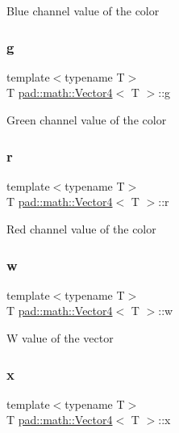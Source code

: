 Blue channel value of the color \mbox{\label{structpad_1_1math_1_1_vector4_ac4a05c791e0522930bed20045239e870}} 
\subsubsection{\texorpdfstring{g}{g}}
{\footnotesize\ttfamily template$<$typename T$>$ \\
T \mbox{\hyperlink{structpad_1_1math_1_1_vector4}{pad\+::math\+::\+Vector4}}$<$ T $>$\+::g}

Green channel value of the color \mbox{\label{structpad_1_1math_1_1_vector4_a2288e82eaf6dd6c283f4714503b13096}} 
\subsubsection{\texorpdfstring{r}{r}}
{\footnotesize\ttfamily template$<$typename T$>$ \\
T \mbox{\hyperlink{structpad_1_1math_1_1_vector4}{pad\+::math\+::\+Vector4}}$<$ T $>$\+::r}

Red channel value of the color \mbox{\label{structpad_1_1math_1_1_vector4_abbbd617d5083a886936724282216bee4}} 
\subsubsection{\texorpdfstring{w}{w}}
{\footnotesize\ttfamily template$<$typename T$>$ \\
T \mbox{\hyperlink{structpad_1_1math_1_1_vector4}{pad\+::math\+::\+Vector4}}$<$ T $>$\+::w}

W value of the vector \mbox{\label{structpad_1_1math_1_1_vector4_a977619c0dbd2e7060bb1f839d3fa8337}} 
\subsubsection{\texorpdfstring{x}{x}}
{\footnotesize\ttfamily template$<$typename T$>$ \\
T \mbox{\hyperlink{structpad_1_1math_1_1_vector4}{pad\+::math\+::\+Vector4}}$<$ T $>$\+::x}

